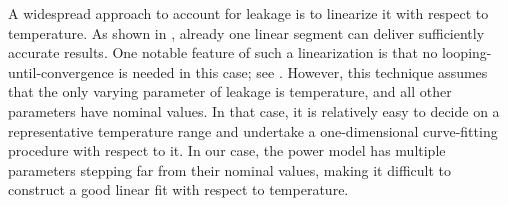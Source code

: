 \begin{remark}
A widespread approach to account for leakage is to linearize it with respect to temperature.
As shown in \cite{liu2007}, already one linear segment can deliver sufficiently accurate results.
One notable feature of such a linearization is that no looping-until-convergence is needed in this case; see \cite{ukhov2012}.
However, this technique assumes that the only varying parameter of leakage is temperature, and all other parameters have nominal values.
In that case, it is relatively easy to decide on a representative temperature range and undertake a one-dimensional curve-fitting procedure with respect to it.
In our case, the power model has multiple parameters stepping far from their nominal values, making it difficult to construct a good linear fit with respect to temperature.
\end{remark}
